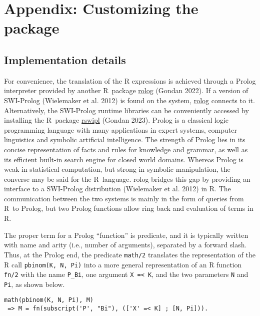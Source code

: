 \hypertarget{appendix-customizing-the-package}{%
\section{Appendix: Customizing the package}\label{appendix-customizing-the-package}}

\hypertarget{implementation-details}{%
\subsection{Implementation details}\label{implementation-details}}

For convenience, the translation of the R expressions is achieved
through a Prolog interpreter provided by another R~package
\href{https://CRAN.R-project.org/package=rolog}{rolog} (Gondan 2022). If a
version of SWI-Prolog (Wielemaker et al. 2012) is found on the system,
\href{https://CRAN.R-project.org/package=rolog}{rolog} connects to it.
Alternatively, the SWI-Prolog runtime libraries can be conveniently
accessed by installing the R~package
\href{https://CRAN.R-project.org/package=rswipl}{rswipl} (Gondan 2023).
Prolog is a classical logic programming language with many applications
in expert systems, computer linguistics and symbolic artificial
intelligence. The strength of Prolog lies in its concise representation
of facts and rules for knowledge and grammar, as well as its efficient
built-in search engine for closed world domains. Whereas Prolog is weak
in statistical computation, but strong in symbolic manipulation, the
converse may be said for the R~language. rolog bridges this gap by
providing an interface to a SWI-Prolog distribution (Wielemaker et al. 2012)
in R. The communication between the two systems is mainly in the
form of queries from R~to Prolog, but two Prolog functions allow ring
back and evaluation of terms in R.

The proper term for a Prolog ``function'' is predicate, and it is
typically written with name and arity (i.e., number of arguments),
separated by a forward slash. Thus, at the Prolog end, the predicate
\texttt{math/2} translates the representation of the R call \texttt{pbinom(K,~N,~Pi)}
into a more general representation of an R function \texttt{fn/2} with the name
\texttt{P\_Bi}, one argument \texttt{X~=\textless{}~K}, and the two parameters \texttt{N} and \texttt{Pi}, as
shown below.

\begin{verbatim}
math(pbinom(K, N, Pi), M)
 => M = fn(subscript('P', "Bi"), (['X' =< K] ; [N, Pi])).
\end{verbatim}

